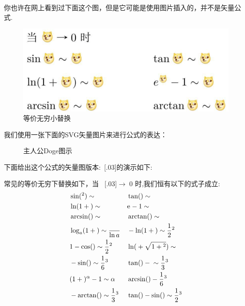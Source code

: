 \documentclass[12pt]{article}
\newcommand{\scale}[2]{%
    \scalebox{#1}[#1]{#2}}
\begin{document}
你也许在网上看到过下面这个图，但是它可能是使用图片插入的，并不是矢量公式.
\begin{figure}[!htb]
    \centering
    \includegraphics[scale=.45]{./Pics/Fomular1.png}
    \caption{等价无穷小替换}
    \label{等价无穷小替换}
\end{figure}


我们使用一张下面的SVG矢量图片来进行公式的表达：
\begin{figure}[!htb]
    \centering
    
    \caption{主人公Doge图示}
    \label{Doge}
\end{figure}


\newcommand{\doge}{\hbox{\scale{.03}{}}}
下面给出这个公式的矢量图版本:\doge 的演示如下:

常见的等价无穷下替换如下，当 \doge  $\to\; 0$ 时,我们恒有以下的式子成立:
\begin{align*}
    & \sin(\doge^2) \sim \doge                      && \tan(\doge)\sim \doge \\
    & \ln(1+\doge)\sim \doge                        && {\rm e}^{\doge} -1 \sim \doge\\
    & \arcsin(\doge) \sim \doge                     && \arctan(\doge) \sim \doge \\
    & \log_a(1+\doge) \sim \frac{\doge}{\ln a}      && \doge - \ln(1+\doge)\sim \frac{1}{2}\doge^2\\
    & 1-\cos(\doge) \sim \frac12\doge^2             && \ln(\doge + \sqrt{1+\doge^2}) \sim \doge \\
    & \doge -\sin(\doge) \sim \frac16\doge^3        && \tan(\doge)-\doge \sim \frac13\doge^3 \\
    & (1+\doge)^\alpha-1 \sim \alpha\doge           && \arcsin(\doge) -\doge \frac16 \doge^3\\
    & \doge - \arctan(\doge) \sim \frac13 \doge^3   && \tan(\doge) -\sin(\doge) \sim \frac12 \doge^3
\end{align*}
\end{document}
